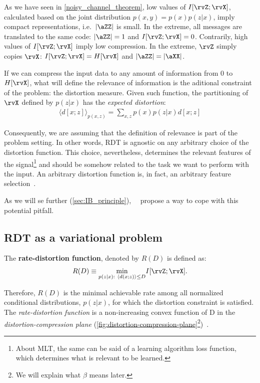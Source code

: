 As we have seen in \cref{noisy_channel_theorem}, low values of $I[\rvZ;\rvX]$, calculated based on the joint distribution $p(x,y)=p(x)p(z|x)$, imply compact representations, i.e.\ $|\aZZ|$ is small. In the extreme, all messages are translated to the same code: $|\aZZ|=1$ and $I[\rvZ;\rvX]=0$. Contrarily, high values of $I[\rvZ;\rvX]$ imply low compression.  In the extreme, $\rvZ$ simply copies $\rvX$: $I[\rvZ;\rvX]=H[\rvX]$ and $|\aZZ|=|\aXX|$.

If we can compress the input data to any amount of information from $0$ to $H[\rvX]$, what will define the relevance of information is the aditional constraint of the problem: the distortion measure. Given such function, the partitioning of $\rvX$ defined by $p(z|x)$ has the \emph{expected distortion}:
\begin{align}
	\langle d[x;z] \rangle _{p(x,z)} = \sum_{x,z} p(x) p(z|x) d[x;z]
\end{align}

Consequently, we are assuming that the definition of relevance is part of the problem setting. In other words, \ac{RDT} is agnostic on any arbitrary choice of the distortion function. This choice, nevertheless, determines the relevant features of the signal\footnote{About MLT, the same can be said of a learning algorithm loss function, which determines what is relevant to be learned.} and should be somehow related to the task we want to perform with the input. An arbitrary distortion function is, in fact, an arbitrary feature selection~\cite{tishby:1999}.

As we will se further (\cref{sec:IB_principle}),~\citeauthor{tishby:1999}~\cite{tishby:1999} propose a way to cope with this potential pitfall.

\subsection{\ac*{RDT} as a variational problem}\label{RDT problem}
\begin{definition}
	 The \textbf{rate-distortion function}, denoted by $R(D)$ is defined as:
	 \begin{align}
		R(D) \equiv \underset{p(z|x):~ \langle d(x;z) \rangle \leq D}{\min} I[\rvZ;\rvX]. \label{rate-distortion function}
	\end{align}
\end{definition}

Therefore, $R(D)$ is the minimal achievable rate among all normalized conditional distributions, $p(z|x)$, for which the distortion constraint is satisfied. The \emph{rate-distortion function} is a non-increasing convex function of D in the \emph{distortion-compression plane} (\cref{fig:distortion-compression-plane}\footnote{We will explain what $\beta$ means later.})~\cite{cover:2006}.


